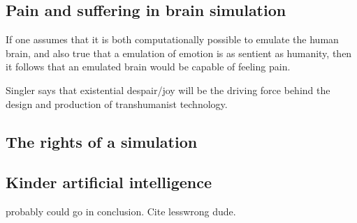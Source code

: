 
\subsection{Pain and suffering in brain simulation}

If one assumes that it is both computationally possible to emulate the human
brain, and also true that a emulation of emotion is as sentient as humanity,
then it follows that an emulated brain would be capable of feeling pain. 

Singler says that existential despair/joy will be the driving force behind the
design and production of transhumanist technology.


\autocite{faggella_preventing_2019}
\autocite{singler_existential_2019}
 
\subsection{The rights of a simulation}

\subsection{Kinder artificial intelligence}
probably could go in conclusion. Cite lesswrong dude.

